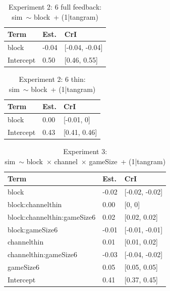 \documentclass[
  english,
  a4paper,
]{article}
\begin{document}
\begin{table}[h!]

\caption{\label{tab:unnamed-chunk-16}Experiment 2: 6 full feedback:\\ sim~$\sim$ block~+ (1|tangram)}
\centering
\begin{tabular}[t]{lll}
\toprule
Term & Est. & CrI\\
\midrule
block & -0.04 & {}[-0.04, -0.04]\\
Intercept & 0.50 & {}[0.46, 0.55]\\
\bottomrule
\end{tabular}
\end{table}

\begin{table}[h!]

\caption{\label{tab:unnamed-chunk-16}Experiment 2: 6 thin:\\ sim~$\sim$ block~+ (1|tangram)}
\centering
\begin{tabular}[t]{lll}
\toprule
Term & Est. & CrI\\
\midrule
block & 0.00 & {}[-0.01, 0]\\
Intercept & 0.43 & {}[0.41, 0.46]\\
\bottomrule
\end{tabular}
\end{table}

\begin{table}[h!]

\caption{\label{tab:unnamed-chunk-16}Experiment 3:\\ sim~$\sim$ block~$\times$ channel~$\times$ gameSize~+ (1|tangram)}
\centering
\begin{tabular}[t]{lll}
\toprule
Term & Est. & CrI\\
\midrule
block & -0.02 & {}[-0.02, -0.02]\\
block:channelthin & 0.00 & {}[0, 0]\\
block:channelthin:gameSize6 & 0.02 & {}[0.02, 0.02]\\
block:gameSize6 & -0.01 & {}[-0.01, -0.01]\\
channelthin & 0.01 & {}[0.01, 0.02]\\
\addlinespace
channelthin:gameSize6 & -0.03 & {}[-0.04, -0.02]\\
gameSize6 & 0.05 & {}[0.05, 0.05]\\
Intercept & 0.41 & {}[0.37, 0.45]\\
\bottomrule
\end{tabular}
\end{table}
\end{document}
